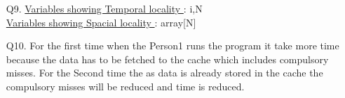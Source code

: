 \documentclass[letterpaper]{article}
\begin{document}
\begin{large}
\begin{flushleft}
\begin{enumerate}
\item[Q9. ]\underline{Variables showing Temporal locality } : i,N\\[0.1in]
\underline{Variables showing Spacial locality } : array[N]\\[0.2in]

\item[Q10. ]For the first time when the Person1 runs the program it take more time because the data has to be fetched to the cache which includes compulsory misses. For the Second time the as data is already stored in the cache the compulsory misses will be reduced and time is reduced.\\[0.1in]
\end{enumerate}
\end{flushleft}
\end{large}
\end{document}
